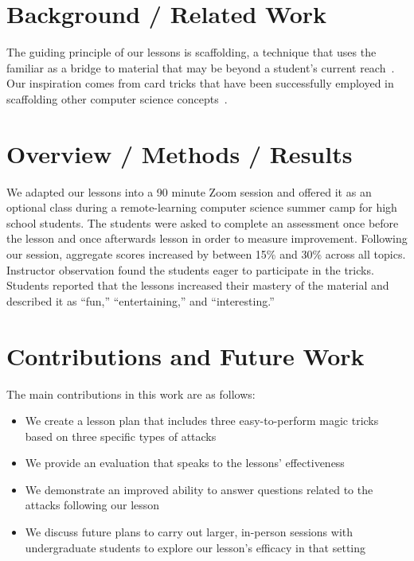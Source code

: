 \documentclass[sigconf]{acmart}
\begin{document}
\section{Background / Related Work}
The guiding principle of our lessons is scaffolding,
a technique that uses the familiar as a bridge to
material that may be beyond a student's current reach~\cite{wood1976role}.
Our inspiration comes from
card tricks that have been successfully employed in scaffolding other
computer science concepts~\cite{bell2009computer, csunplugged,
garcia2016demystifying, curzon2008engaging}.


\section{Overview / Methods / Results}

We adapted our lessons into a 90 minute Zoom session
and offered it as an optional class during
a remote-learning computer science summer camp for high school
students.
The students were
asked to complete an assessment once before the lesson
and once afterwards lesson in order to measure improvement.
Following our session, aggregate scores increased by between 15\% and 30\%
across all topics.
Instructor observation found the students eager to participate in the
tricks. Students reported that the lessons increased their mastery of the material
and described it as ``fun,''
``entertaining,'' and ``interesting.''

\section{Contributions and Future Work}

The main contributions in this work are as follows:

\begin{itemize}

\item{We create a lesson plan that includes three easy-to-perform magic
    tricks based on three specific types of attacks}

\item{We provide an evaluation that speaks to the lessons' effectiveness}

\item{We demonstrate an improved ability to answer questions related to the
    attacks following our lesson}

\item{We discuss future plans to carry out larger, in-person sessions with
    undergraduate students to explore our lesson's efficacy in that
        setting}

\end{itemize}
\end{document}
